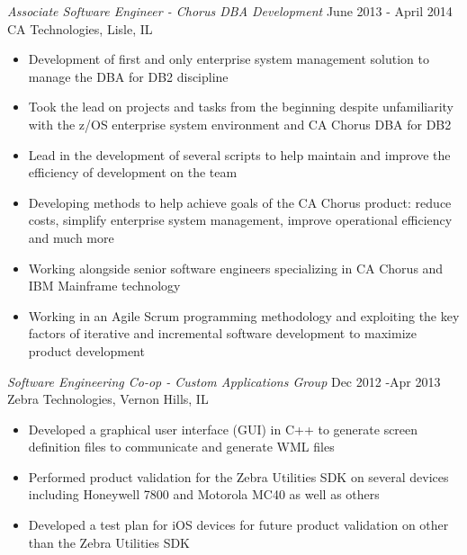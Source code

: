 \documentclass[margin]{res}
\newcommand{\tab}{\hspace*{2em}}
\begin{document}
\begin{resume}
{\sl Associate Software Engineer - Chorus DBA Development} \hfill June 2013 - April 2014\\
	CA Technologies, Lisle, IL		\tab	\tab\tab\tab\tab\tab\tab\tab			
	\begin{itemize}  \itemsep -2pt %
	\item Development of first and only enterprise system management solution to manage the DBA for DB2 discipline
	\item Took the lead on projects and tasks from the beginning despite unfamiliarity with the z/OS enterprise system environment and CA Chorus DBA for DB2
	\item Lead in the development of several scripts to help maintain and improve the efficiency of development on the team
	\item Developing methods to help achieve goals of the CA Chorus product: reduce costs, simplify enterprise system management, improve operational efficiency and much more
	\item Working alongside senior software engineers specializing in CA Chorus and IBM Mainframe technology
	\item Working in an Agile Scrum programming methodology and exploiting the key factors of iterative and incremental software development to maximize product development
	\end{itemize}

{\sl Software Engineering Co-op - Custom Applications Group} \hfill Dec 2012 -Apr 2013\\
    Zebra Technologies, Vernon Hills, IL		\tab	\tab\tab\tab\tab\tab\tab\tab			
 	\begin{itemize}  \itemsep -2pt %
	\item Developed a graphical user interface (GUI) in C++ to generate screen definition files to communicate and generate WML files
	\item Performed product validation for the Zebra Utilities SDK on several devices including Honeywell 7800 and Motorola MC40 as well as others
	\item Developed a test plan for iOS devices for future product validation on other than the Zebra Utilities SDK
	\end{itemize}


\end{resume}
\end{document}
